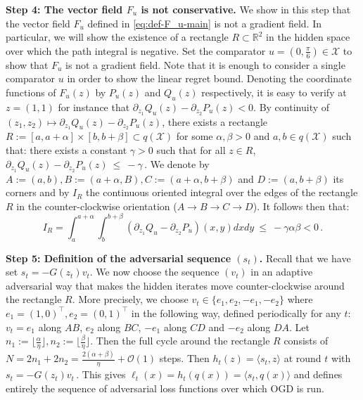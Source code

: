 \documentclass[a4paper,11pt,fullpage]{article}
\theoremstyle{plain}
\theoremstyle{definition}
\theoremstyle{plain}
\renewcommand{\leq}{~\le~}
\begin{document}
\noindent\textbf{Step 4: The vector field $F_u$ is not conservative.} 
We show in this step that the vector field $F_u$ defined in \eqref{eq:def-F_u-main} is not a gradient field. 
In particular, we will show the existence of a rectangle $R \subset \mathbb{R}^2$ in the hidden space over which the path integral is negative. 
Set the comparator $u = (0, \frac{\pi}{6}) \in \mathcal{X}$ to show that $F_u$ is not a gradient field. 
Note that it is enough to consider a single comparator $u$ in order to show the linear regret bound. 
Denoting the coordinate functions of $F_u(z)$ by $P_u(z)$ and $Q_u(z)$ respectively, it is easy to verify at $z = (1,1)$ for instance 
that $\partial_{z_1} Q_u(z) - \partial_{z_2} P_u(z) < 0$.
By continuity of $(z_1, z_2) \mapsto \partial_{z_1} Q_u(z) - \partial_{z_2} P_u(z)$, 
there exists a rectangle $R := [a, a+ \alpha] \times [b, b+\beta] \subset q(\mathcal{X})$ for some $\alpha, \beta > 0$ and $a,b \in q(\mathcal{X})$ such that:
there exists a constant $\gamma > 0$ such that for all $z \in R$, $\partial_{z_1} Q_u(z) - \partial_{z_2} P_u(z) \leq - \gamma$\,. 
We denote by $A := (a,b), B:= (a+ \alpha, B), C:= (a+\alpha, b+ \beta)$ and $D:= (a, b + \beta)$ its corners and 
by $I_R$ the continuous oriented integral over the edges of the rectangle $R$ in the counter-clockwise orientation ($A \to B \to C \to D$). 
It follows then that: 
\begin{equation}
\label{eq:integral-I_R-main}
    I_R = \int_a^{a + \alpha} \int_b^{b+\beta} (\partial_{z_1} Q_u - \partial_{z_2} P_u)(x,y) dx dy \leq - \gamma \alpha \beta < 0\,.
\end{equation}

\noindent\textbf{Step 5: Definition of the adversarial sequence $(s_t)$.} 
Recall that we have set $s_t = - G(z_t) v_t$. 
We now choose the sequence $(v_t)$ in an adaptive adversarial way that makes the hidden iterates move counter-clockwise around the rectangle $R$. 
More precisely, we choose $v_t \in \{e_1, e_2, -e_1, -e_2 \}$ where $e_1 = (1,0)^{\top}, e_2 = (0,1)^{\top}$ in the following way, 
defined periodically for any $t$: $v_t = e_1$ along $AB$, $e_2$ along $BC$, $-e_1$ along $CD$ and $-e_2$ along $DA$. 
Let $n_1 := \lfloor \frac{\alpha}{\eta}\rfloor, n_2 :=  \lfloor \frac{\beta}{\eta}\rfloor$. 
Then the full cycle around the rectangle $R$ consists of $N = 2 n_1 + 2 n_2 = \frac{2(\alpha + \beta)}{\eta} + \mathcal{O}(1)$ steps. 
Then $h_t(z) = \langle s_t, z \rangle$ at round $t$ with $s_t = - G(z_t) v_t\,.$ 
This gives $\ell_t(x) =h_t(q(x)) = \langle s_t, q(x)\rangle$ and defines entirely the sequence of adversarial loss functions over which OGD is run. 
\end{document}
